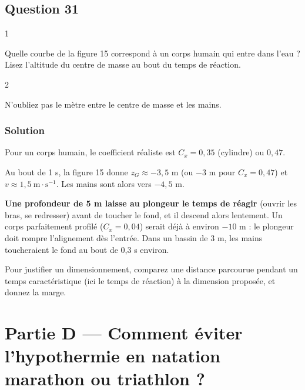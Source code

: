 \documentclass[11pt,a4paper]{article}
\begin{document}
\hypertarget{question-31}{%
\subsection{Question 31}\label{question-31}}

\begin{indication}{1}

Quelle courbe de la figure 15 correspond à un corps humain qui entre dans l'eau ? Lisez l'altitude du centre de masse au bout du temps de réaction.

\end{indication}

\begin{indication}{2}

N'oubliez pas le mètre entre le centre de masse et les mains.

\end{indication}

\hypertarget{solution-30}{%
\subsubsection{Solution}\label{solution-30}}

Pour un corps humain, le coefficient réaliste est \(C_x = 0{,}35\) (cylindre) ou \(0{,}47\).

Au bout de 1 s, la figure 15 donne \(z_G \approx -3{,}5\) m (ou \(-3\) m pour \(C_x = 0{,}47\)) et \(v \approx 1{,}5\ \mathrm{m\cdot s^{-1}}\). Les mains sont alors vers \(-4{,}5\) m.

\textbf{Une profondeur de 5 m laisse au plongeur le temps de réagir} (ouvrir les bras, se redresser) avant de toucher le fond, et il descend alors lentement. Un corps parfaitement profilé (\(C_x = 0{,}04\)) serait déjà à environ \(-10\) m : le plongeur doit rompre l'alignement dès l'entrée. Dans un bassin de 3 m, les mains toucheraient le fond au bout de 0,3 s environ.

\begin{methode}

Pour justifier un dimensionnement, comparez une distance parcourue pendant un temps caractéristique (ici le temps de réaction) à la dimension proposée, et donnez la marge.

\end{methode}

\hypertarget{partie-d-comment-uxe9viter-lhypothermie-en-natation-marathon-ou-triathlon}{%
\section{Partie D --- Comment éviter l'hypothermie en natation marathon ou triathlon ?}\label{partie-d-comment-uxe9viter-lhypothermie-en-natation-marathon-ou-triathlon}}
\end{document}
